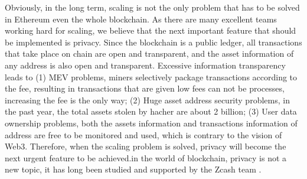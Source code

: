 Obviously, in the long term, scaling is not the only problem that has to be solved in Ethereum\cite{website:Ethereum} even the whole blockchain. As there are
many excellent teams working hard for scaling, we believe that the next important feature that should be implemented is privacy. Since the blockchain is 
a public ledger, all transactions that take place on chain are open and transparent, 
and the asset information of any address is also open and transparent. Excessive 
information transparency leads to (1) MEV problems, miners selectively package 
transactions according to the fee, resulting in transactions that are given low fees can not be 
processes, increasing the fee is the only way; (2) Huge asset address security problems, in the past 
year, the total assets stolen by hacher are about 2 billion; (3) User data 
ownership problems, both the assets information and transactions information of address are free to be monitored and used, which is contrary to 
the vision of Web3\cite{website:Web3}. Therefore, when the scaling problem is solved, privacy will become the next urgent feature to be achieved.in the world of 
blockchain, privacy is not a new topic, it has long been studied and supported by the Zcash team \cite{website:Zcash}.




